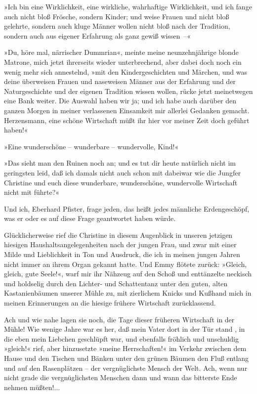 »Ich bin eine Wirklichkeit, eine wirkliche, wahrhaftige
Wirklichkeit, und ich fange auch nicht bloß Frösche, sondern
Kinder; und weise Frauen und nicht bloß gelehrte, sondern auch
kluge Männer wollen nicht bloß nach der Tradition, sondern auch aus
eigener Erfahrung als ganz gewiß wissen~–«

»Du, höre mal, närrischer Dummrian«, meinte meine neunzehnjährige
blonde Matrone, mich jetzt ihrerseits wieder unterbrechend, aber
dabei doch noch ein wenig mehr sich annestelnd, »mit den
Kindergeschichten und Märchen, und was deine überweisen Frauen und
naseweisen Männer aus der Erfahrung und der Naturgeschichte und der
eigenen Tradition wissen wollen, rücke jetzt meinetwegen eine Bank
weiter. Die Auswahl haben wir ja; und ich habe auch darüber den
ganzen Morgen in meiner verlassenen Einsamkeit mir allerlei
Gedanken gemacht. Herzensmann, eine schöne Wirtschaft müßt ihr hier
vor meiner Zeit doch geführt haben!«

»Eine wunderschöne – wunderbare – wundervolle, Kind!«

»Das sieht man den Ruinen noch an; und es tut dir heute natürlich
nicht im geringsten leid, daß ich damals nicht auch schon mit
dabeiwar wie die Jungfer Christine und euch diese wunderbare,
wunderschöne, wundervolle Wirtschaft nicht mit führte?«

Und ich, Eberhard Pfister, frage jeden, das heißt jedes männliche
Erdengeschöpf, was er oder es auf diese Frage geantwortet haben
würde.

Glücklicherweise rief die Christine in diesem Augenblick in unseren
jetzigen hiesigen Haushaltsangelegenheiten nach der jungen Frau,
und zwar mit einer Milde und Lieblichkeit in Ton und Ausdruck, die
ich in meinen jungen Jahren nicht immer an ihrem Organ gekannt
hatte. Und Emmy flötete zurück: »Gleich, gleich, gute Seele!«, warf
mir ihr Nähzeug auf den Schoß und enttänzelte neckisch und
holdselig durch den Lichter- und Schattentanz unter den guten,
alten Kastanienbäumen unserer Mühle zu, mit zierlichem Knicks und
Kußhand mich in meinen Erinnerungen an die hiesige frühere
Wirtschaft zurücklassend.

Ach und wie nahe lagen sie noch, die Tage dieser früheren
Wirtschaft in der Mühle! Wie wenige Jahre war es her, daß mein
Vater dort in der Tür stand , in die eben mein Liebchen geschlüpft
war, und ebenfalls fröhlich und unschuldig »gleich!« rief, aber
hinzusetzte »meine Herrschaften!« im Verkehr zwischen dem Hause und
den Tischen und Bänken unter den grünen Bäumen den Fluß entlang und
auf den Rasenplätzen – der vergnüglichste Mensch der Welt. Ach,
wenn nur nicht grade die vergnüglichsten Menschen dann und wann das
bitterste Ende nehmen müßten!...

